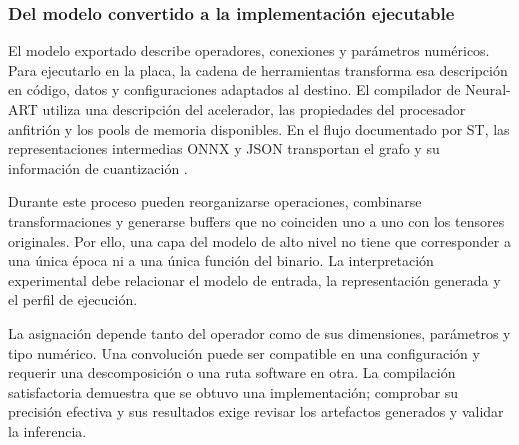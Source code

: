 \subsubsection{Del modelo convertido a la implementación ejecutable}
El modelo exportado describe operadores, conexiones y parámetros numéricos. Para ejecutarlo en la placa, la cadena de herramientas transforma esa descripción en código, datos y configuraciones adaptados al destino. El compilador de Neural-ART utiliza una descripción del acelerador, las propiedades del procesador anfitrión y los pools de memoria disponibles. En el flujo documentado por ST, las representaciones intermedias ONNX y JSON transportan el grafo y su información de cuantización \cite{cap4_stcompiler}.

Durante este proceso pueden reorganizarse operaciones, combinarse transformaciones y generarse buffers que no coinciden uno a uno con los tensores originales. Por ello, una capa del modelo de alto nivel no tiene que corresponder a una única época ni a una única función del binario. La interpretación experimental debe relacionar el modelo de entrada, la representación generada y el perfil de ejecución.

La asignación depende tanto del operador como de sus dimensiones, parámetros y tipo numérico. Una convolución puede ser compatible en una configuración y requerir una descomposición o una ruta software en otra. La compilación satisfactoria demuestra que se obtuvo una implementación; comprobar su precisión efectiva y sus resultados exige revisar los artefactos generados y validar la inferencia.

